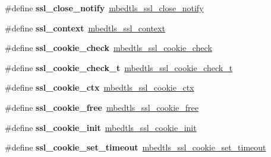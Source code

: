 \begin{DoxyCompactItemize}
\item 
\mbox{\label{compat-1_83_8h_a89279581d264bd1cd116ef7de95e7144}} 
\#define {\bfseries ssl\+\_\+close\+\_\+notify}~\mbox{\hyperlink{ssl_8h_ac2c1b17128ead2df3082e27b603deb4c}{mbedtls\+\_\+ssl\+\_\+close\+\_\+notify}}
\item 
\mbox{\label{compat-1_83_8h_a33956cb724e6d0fda00f6109f8274223}} 
\#define {\bfseries ssl\+\_\+context}~\mbox{\hyperlink{structmbedtls__ssl__context}{mbedtls\+\_\+ssl\+\_\+context}}
\item 
\mbox{\label{compat-1_83_8h_a060dbceec05bf37b04ca1cc6d13a96e5}} 
\#define {\bfseries ssl\+\_\+cookie\+\_\+check}~\mbox{\hyperlink{ssl__cookie_8h_ac83489027c04984e12f89b1b29eac27b}{mbedtls\+\_\+ssl\+\_\+cookie\+\_\+check}}
\item 
\mbox{\label{compat-1_83_8h_a890378346dbc084eaa926c719b9eb3fc}} 
\#define {\bfseries ssl\+\_\+cookie\+\_\+check\+\_\+t}~\mbox{\hyperlink{ssl_8h_a9cfda5aee70d6c2c19a8dfb5af900d80}{mbedtls\+\_\+ssl\+\_\+cookie\+\_\+check\+\_\+t}}
\item 
\mbox{\label{compat-1_83_8h_aac80805a806cc43dcaaa74aef15b30af}} 
\#define {\bfseries ssl\+\_\+cookie\+\_\+ctx}~\mbox{\hyperlink{structmbedtls__ssl__cookie__ctx}{mbedtls\+\_\+ssl\+\_\+cookie\+\_\+ctx}}
\item 
\mbox{\label{compat-1_83_8h_a2d06826db19ddd37a6bd0a0bd82ed13f}} 
\#define {\bfseries ssl\+\_\+cookie\+\_\+free}~\mbox{\hyperlink{ssl__cookie_8h_a77d57052186940783e056f5ca95bda03}{mbedtls\+\_\+ssl\+\_\+cookie\+\_\+free}}
\item 
\mbox{\label{compat-1_83_8h_ac4bcc8d4e19040a3eb3ee1da6e69b802}} 
\#define {\bfseries ssl\+\_\+cookie\+\_\+init}~\mbox{\hyperlink{ssl__cookie_8h_affed42a7313e08576aad621f25d5c4f3}{mbedtls\+\_\+ssl\+\_\+cookie\+\_\+init}}
\item 
\mbox{\label{compat-1_83_8h_a60383c1e039e990397c8465c69189ebf}} 
\#define {\bfseries ssl\+\_\+cookie\+\_\+set\+\_\+timeout}~\mbox{\hyperlink{ssl__cookie_8h_a5ae5d375a80fbe6f6f1b219c1b1dc8bb}{mbedtls\+\_\+ssl\+\_\+cookie\+\_\+set\+\_\+timeout}}

\end{DoxyCompactItemize}
